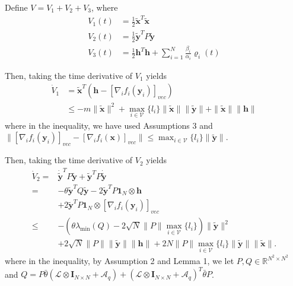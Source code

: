 \documentclass[lettersize,journal]{IEEEtran}
\begin{document}
\begin{IEEEproof}
    Define $V = V_1 + V_2 + V_3$, where
    \begin{equation}
        \begin{aligned}
            V_1(t) & = \frac{1}{2}\tilde{\mathbf{x}}^{T}\tilde{\mathbf{x}}                                         \\
            V_2(t) & = \frac{1}{2}\tilde{\mathbf{y}}^{T}P\tilde{\mathbf{y}}                                        \\
            V_3(t) & = \frac{1}{2}\mathbf{h}^{T}\mathbf{h} + \sum_{i = 1}^{N} \frac{\beta_i}{\alpha_i}\varrho_i(t)
        \end{aligned}
    \end{equation}

    Then, taking the time derivative of $V_1$ yields
    \begin{equation}
        \begin{aligned}
            \dot{V}_{1} & =\tilde{\mathbf{x}}^{T}(\mathbf{h}-[\nabla_{i}f_{i}(\mathbf{y}_{i})]_{vec})                                                                   \\
                        & \leq-m\|\tilde{\mathbf{x}}\|^2+\max_{i\in\mathcal{V}}\{l_i\}\|\tilde{\mathbf{x}}\|\|\tilde{\mathbf{y}}\|+\|\tilde{\mathbf{x}}\|\|\mathbf{h}\|
        \end{aligned}
    \end{equation}
    where in the inequality, we have used Assumptions 3 and $\|[\nabla_{i}f_{i}(\mathbf{y}_{i})]_{vec}-[\nabla_{i}f_{i}(\mathbf{x})]_{vec}\|\leq\max_{i\in\mathcal{V}}\{l_{i}\}\|\tilde{\mathbf{y}}\|$.

    Then, taking the time derivative of $V_2$ yields
    \begin{equation}
        \begin{aligned}
            \dot{V}_{2}= & \dot{\tilde{\mathbf{y}}}^{T}P\tilde{\mathbf{y}}+\tilde{\mathbf{y}}^{T}P\dot{\tilde{\mathbf{y}}}                                         \\
            =            & -\theta\tilde{\mathbf{y}}^TQ\tilde{\mathbf{y}}-2\tilde{\mathbf{y}}^TP\mathbf{1}_N\otimes\mathbf{h}                                      \\
                         & +2\tilde{\mathbf{y}}^TP\mathbf{1}_N\otimes[\nabla_if_i(\mathbf{y}_i)]_{vec}                                                             \\
            \leq         & -(\theta\lambda_{\min}(Q)-2\sqrt{N}\|P\|\max_{i\in\mathcal{V}}\{l_{i}\})\|\tilde{\mathbf{y}}\|^{2}                                      \\
                         & +2\sqrt{N}\|P\|\|\tilde{\mathbf{y}}\|\|\mathbf{h}\|+2N\|P\|\max_{i\in\mathcal{V}}\{l_{i}\}\|\tilde{\mathbf{y}}\|\|\tilde{\mathbf{x}}\|.
        \end{aligned}
    \end{equation}
    where in the inequality, by Assumption 2 and Lemma 1, we let $P,Q\in\mathbb{R}^{N^{2}\times N^{2}}$ and $Q = P\bar{\theta}(\mathcal{L}\otimes\mathbf{I}_{N\times N}+\mathcal{A}_q)+(\mathcal{L}\otimes\mathbf{I}_{N\times N}+\mathcal{A}_q)^T\bar{\theta}P$.


\end{IEEEproof}
\end{document}

